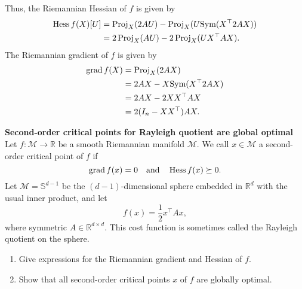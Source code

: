 \documentclass[en, oneside]{assignment}
\begin{document}
\begin{sol}
\begin{enumerate}[label=(\arabic*)]
        Thus, the Riemannian Hessian of $f$ is given by
        \begin{align*}
            \operatorname{Hess} f(X)[U] &= \operatorname{Proj}_X(2 A U) - \operatorname{Proj}_X(U \text{Sym}(X^\top 2 A X))\\
            &= 2\operatorname{Proj}_X(A U) - 2\operatorname{Proj}_X(U X^\top A X).
        \end{align*}
        The Riemannian gradient of $f$ is given by
        \begin{align*}
            \operatorname{grad} f(X) &= \operatorname{Proj}_X(2 A X)\\
            &= 2 A X - X \text{Sym}(X^\top 2 A X)\\
            &= 2 A X - 2 X X^\top A X\\
            &= 2 (I_n - X X^\top) A X.
        \end{align*}
    \end{enumerate}
\end{sol}

 \begin{prob} \textbf{Second-order critical points for Rayleigh quotient are global optimal}\\
    Let $f: \mathcal{M} \to \mathbb{R}$ be a smooth Riemannian manifold $\mathcal{M}$. We call $x \in \mathcal{M}$ a second-order critical point of $f$ if
    \begin{equation*}
        \operatorname{grad} f(x) = 0 \quad \text{and} \quad \operatorname{Hess} f(x) \succeq 0.
    \end{equation*}
    Let $\mathcal{M} = \mathbb{S}^{d-1}$ be the $(d-1)$-dimensional sphere embedded in $\mathbb{R}^d$ with the usual inner product, and let
    \begin{equation*}
        f(x) = \frac{1}{2} x^\top A x,
    \end{equation*}
    where symmetric $A \in \mathbb{R}^{d \times d}$. This cost function is sometimes called the Rayleigh quotient on the sphere.
    \begin{enumerate}[label=(\arabic*)]
        \item Give expressions for the Riemannian gradient and Hessian of $f$.
        \item Show that all second-order critical points $x$ of $f$ are globally optimal.
    \end{enumerate}
 \end{prob}
\end{document}
